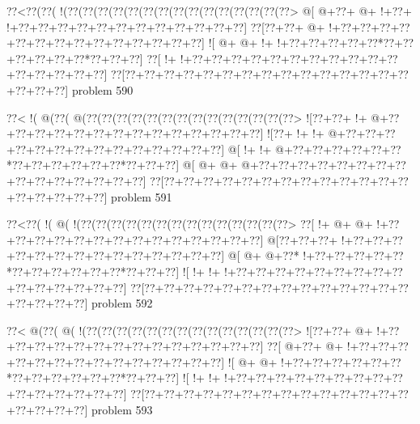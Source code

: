 \vbox{\vbox{\goo
\0??<\0??(\0??(\- !(\0??(\0??(\0??(\0??(\0??(\0??(\0??(\0??(\0??(\0??(\0??(\0??(\0??(\0??(\0??>
\- @[\- @+\0??+\- @+\- !+\0??+\- !+\0??+\0??+\0??+\0??+\0??+\0??+\0??+\0??+\0??+\0??+\0??+\0??]
\0??[\0??+\0??+\- @+\- !+\0??+\0??+\0??+\0??+\0??+\0??+\0??+\0??+\0??+\0??+\0??+\0??+\0??+\0??]
\- ![\- @+\- @+\- !+\- !+\0??+\0??+\0??+\0??+\0??*\0??+\0??+\0??+\0??+\0??+\0??*\0??+\0??+\0??]
\0??[\- !+\- !+\0??+\0??+\0??+\0??+\0??+\0??+\0??+\0??+\0??+\0??+\0??+\0??+\0??+\0??+\0??+\0??]
\0??[\0??+\0??+\0??+\0??+\0??+\0??+\0??+\0??+\0??+\0??+\0??+\0??+\0??+\0??+\0??+\0??+\0??+\0??]
}
\hfil problem 590\hfil\break
}



\vbox{\vbox{\goo
\0??<\- !(\- @(\0??(\- @(\0??(\0??(\0??(\0??(\0??(\0??(\0??(\0??(\0??(\0??(\0??(\0??(\0??(\0??>
\- ![\0??+\0??+\- !+\- @+\0??+\0??+\0??+\0??+\0??+\0??+\0??+\0??+\0??+\0??+\0??+\0??+\0??+\0??]
\- ![\0??+\- !+\- !+\- @+\0??+\0??+\0??+\0??+\0??+\0??+\0??+\0??+\0??+\0??+\0??+\0??+\0??+\0??]
\- @[\- !+\- !+\- @+\0??+\0??+\0??+\0??+\0??+\0??*\0??+\0??+\0??+\0??+\0??+\0??*\0??+\0??+\0??]
\- @[\- @+\- @+\- @+\0??+\0??+\0??+\0??+\0??+\0??+\0??+\0??+\0??+\0??+\0??+\0??+\0??+\0??+\0??]
\0??[\0??+\0??+\0??+\0??+\0??+\0??+\0??+\0??+\0??+\0??+\0??+\0??+\0??+\0??+\0??+\0??+\0??+\0??]
}
\hfil problem 591\hfil\break
}



\vbox{\vbox{\goo
\0??<\0??(\- !(\- @(\- !(\0??(\0??(\0??(\0??(\0??(\0??(\0??(\0??(\0??(\0??(\0??(\0??(\0??(\0??>
\0??[\- !+\- @+\- @+\- !+\0??+\0??+\0??+\0??+\0??+\0??+\0??+\0??+\0??+\0??+\0??+\0??+\0??+\0??]
\- @[\0??+\0??+\0??+\- !+\0??+\0??+\0??+\0??+\0??+\0??+\0??+\0??+\0??+\0??+\0??+\0??+\0??+\0??]
\- @[\- @+\- @+\0??*\- !+\0??+\0??+\0??+\0??+\0??*\0??+\0??+\0??+\0??+\0??+\0??*\0??+\0??+\0??]
\- ![\- !+\- !+\- !+\0??+\0??+\0??+\0??+\0??+\0??+\0??+\0??+\0??+\0??+\0??+\0??+\0??+\0??+\0??]
\0??[\0??+\0??+\0??+\0??+\0??+\0??+\0??+\0??+\0??+\0??+\0??+\0??+\0??+\0??+\0??+\0??+\0??+\0??]
}
\hfil problem 592\hfil\break
}



\vbox{\vbox{\goo
\0??<\- @(\0??(\- @(\- !(\0??(\0??(\0??(\0??(\0??(\0??(\0??(\0??(\0??(\0??(\0??(\0??(\0??(\0??>
\- ![\0??+\0??+\- @+\- !+\0??+\0??+\0??+\0??+\0??+\0??+\0??+\0??+\0??+\0??+\0??+\0??+\0??+\0??]
\0??[\- @+\0??+\- @+\- !+\0??+\0??+\0??+\0??+\0??+\0??+\0??+\0??+\0??+\0??+\0??+\0??+\0??+\0??]
\- ![\- @+\- @+\- !+\0??+\0??+\0??+\0??+\0??+\0??*\0??+\0??+\0??+\0??+\0??+\0??*\0??+\0??+\0??]
\- ![\- !+\- !+\- !+\0??+\0??+\0??+\0??+\0??+\0??+\0??+\0??+\0??+\0??+\0??+\0??+\0??+\0??+\0??]
\0??[\0??+\0??+\0??+\0??+\0??+\0??+\0??+\0??+\0??+\0??+\0??+\0??+\0??+\0??+\0??+\0??+\0??+\0??]
}
\hfil problem 593\hfil\break
}



